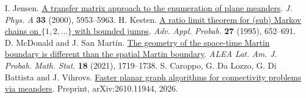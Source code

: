  I. Jensen.
\href{https://doi.org/10.1088/0305-4470/33/34/301}{A transfer matrix approach to the enumeration of plane meanders}.
\emph{J. Phys. A} \textbf{33} (2000), 5953--5963.
 H. Kesten.
\href{https://doi.org/10.2307/1428129}{A ratio limit theorem for (sub) Markov chains on \(\{1,2,\ldots\}\) with bounded jumps}.
\emph{Adv. Appl. Probab.} \textbf{27} (1995), 652--691.
 D. McDonald and J. San Mart\'in.
\href{https://doi.org/10.30757/ALEA.v18-63}{The geometry of the space-time Martin boundary is different than the spatial Martin boundary}.
\emph{ALEA Lat. Am. J. Probab. Math. Stat.} \textbf{18} (2021), 1719--1738.
 S. Caroppo, G. Da Lozzo, G. Di Battista and J. Vihrovs.
\href{https://arxiv.org/abs/2610.11944}{Faster planar graph algorithms for connectivity problems via meanders}.
Preprint, arXiv:2610.11944, 2026.
